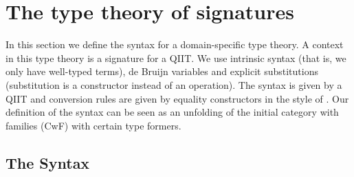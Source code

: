 \documentclass[acmsmall,screen]{acmart}
\begin{document}

\section{The type theory of signatures}
\label{sec:signatures}

In this section we define the syntax for a domain-specific type
theory. A context in this type theory is a signature for a QIIT. We
use intrinsic syntax (that is, we only have well-typed terms), de
Bruijn variables and explicit substitutions (substitution is a
constructor instead of an operation). The syntax is given by a QIIT
and conversion rules are given by equality constructors in the style
of \cite{ttintt}. Our definition of the syntax can be seen as an
unfolding of the initial category with families (CwF)
\cite{Dybjer96internaltype} with certain type formers.

\subsection{The Syntax}
\label{sec:syntax}
\end{document}
